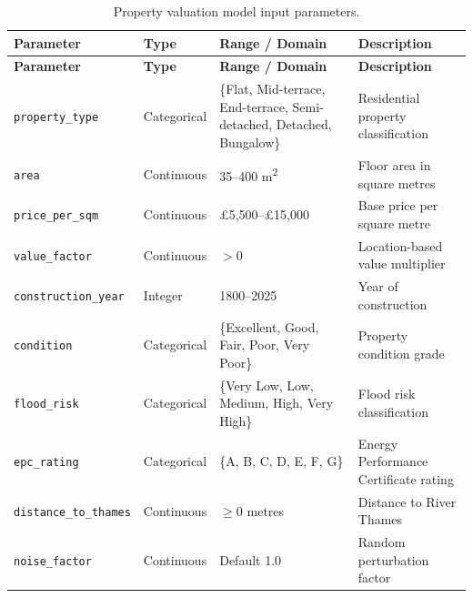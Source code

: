 \documentclass[11pt,a4paper]{article}
\begin{document}
\begin{longtable}{p{4cm}p{3cm}p{3cm}p{4.5cm}}
\caption{Property valuation model input parameters.}
\label{tab:inputs_valuation} \\
\toprule
\textbf{Parameter} & \textbf{Type} & \textbf{Range / Domain} & \textbf{Description} \\
\midrule
\endfirsthead
\toprule
\textbf{Parameter} & \textbf{Type} & \textbf{Range / Domain} & \textbf{Description} \\
\midrule
\endhead
\texttt{property\_type} & Categorical & \{Flat, Mid-terrace, End-terrace, Semi-detached, Detached, Bungalow\} & Residential property classification \\
\midrule
\texttt{area} & Continuous & 35--400 m\textsuperscript{2} & Floor area in square metres \\
\midrule
\texttt{price\_per\_sqm} & Continuous & \pounds5,500--\pounds15,000 & Base price per square metre \\
\midrule
\texttt{value\_factor} & Continuous & $> 0$ & Location-based value multiplier \\
\midrule
\texttt{construction\_year} & Integer & 1800--2025 & Year of construction \\
\midrule
\texttt{condition} & Categorical & \{Excellent, Good, Fair, Poor, Very Poor\} & Property condition grade \\
\midrule
\texttt{flood\_risk} & Categorical & \{Very Low, Low, Medium, High, Very High\} & Flood risk classification \\
\midrule
\texttt{epc\_rating} & Categorical & \{A, B, C, D, E, F, G\} & Energy Performance Certificate rating \\
\midrule
\texttt{distance\_to\_thames} & Continuous & $\geq 0$ metres & Distance to River Thames \\
\midrule
\texttt{noise\_factor} & Continuous & Default 1.0 & Random perturbation factor \\
\bottomrule
\end{longtable}
\end{document}
